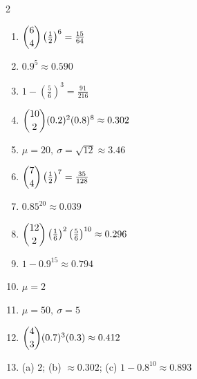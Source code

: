 \documentclass[11pt]{article}
\begin{document}
\begin{keybox}
\begin{multicols}{2}
\small
\begin{enumerate}[leftmargin=*,itemsep=3pt]
  \item $\dbinom{6}{4}\left(\tfrac12\right)^6=\tfrac{15}{64}$
  \item $0.9^5\approx0.590$
  \item $1-\left(\tfrac56\right)^3=\tfrac{91}{216}$
  \item $\dbinom{10}{2}(0.2)^2(0.8)^8\approx0.302$
  \item $\mu=20,\ \sigma=\sqrt{12}\approx3.46$
  \item $\dbinom{7}{4}\left(\tfrac12\right)^7=\tfrac{35}{128}$
  \item $0.85^{20}\approx0.039$
  \item $\dbinom{12}{2}\left(\tfrac16\right)^2\left(\tfrac56\right)^{10}\approx0.296$
  \item $1-0.9^{15}\approx0.794$
  \item $\mu=2$
  \item $\mu=50,\ \sigma=5$
  \item $\dbinom{4}{3}(0.7)^3(0.3)\approx0.412$
  \item (a) $2$; (b) $\approx0.302$; (c) $1-0.8^{10}\approx0.893$
\end{enumerate}
\end{multicols}
\end{keybox}
\end{document}
